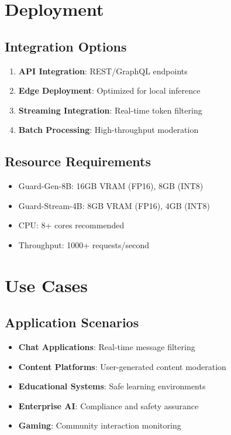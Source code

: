 \documentclass[11pt]{article}
\begin{document}
\section{Deployment}

\subsection{Integration Options}

\begin{enumerate}
\item \textbf{API Integration}: REST/GraphQL endpoints
\item \textbf{Edge Deployment}: Optimized for local inference
\item \textbf{Streaming Integration}: Real-time token filtering
\item \textbf{Batch Processing}: High-throughput moderation
\end{enumerate}

\subsection{Resource Requirements}

\begin{itemize}
\item Guard-Gen-8B: 16GB VRAM (FP16), 8GB (INT8)
\item Guard-Stream-4B: 8GB VRAM (FP16), 4GB (INT8)
\item CPU: 8+ cores recommended
\item Throughput: 1000+ requests/second
\end{itemize}

\section{Use Cases}

\subsection{Application Scenarios}

\begin{itemize}
\item \textbf{Chat Applications}: Real-time message filtering
\item \textbf{Content Platforms}: User-generated content moderation
\item \textbf{Educational Systems}: Safe learning environments
\item \textbf{Enterprise AI}: Compliance and safety assurance
\item \textbf{Gaming}: Community interaction monitoring
\end{itemize}
\end{document}
